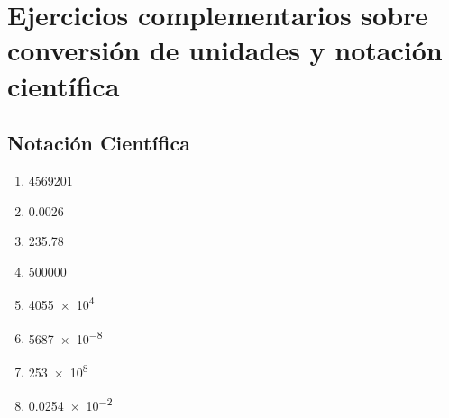 %
%
%


\section{Ejercicios complementarios sobre conversión de unidades y notación científica}

\subsection{Notación Científica}

\begin{exercise}
    \phantom{a}
    \begin{enumerate}[label=\letraminuscula]
        \item \num{4569201}
        \item \num{0.0026}
        \item \num{235.78}
        \item \num{500000}
        \item \num{4055e4}
        \item \num{5687e-8}
        \item \num{253e8}
        \item \num{0.0254e-2}
    \end{enumerate}
\end{exercise}

